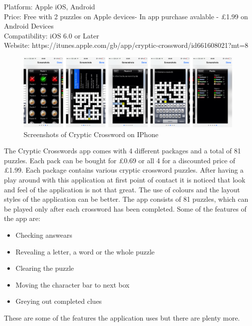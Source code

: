 Platform: Apple iOS, Android\\
Price: Free with 2 puzzles on Apple devices- In app purchase avalable - \pounds1.99 on Android Devices\\
Compatibility: iOS 6.0 or Later\\
Website: https://itunes.apple.com/gb/app/cryptic-crossword/id661608021?mt=8


\begin{figure}[!ht]
    \includegraphics[width=\linewidth]{research/mobile_platforms/cc.png}
    \caption{Screenshots of Cryptic Crossword on IPhone}
\end{figure}

The Cryptic Crosswords app comes with 4 different packages and a total of 81 puzzles. Each pack can be bought for \pounds0.69 or all 4 for a discounted price of \pounds1.99. Each package contains various cryptic crossword puzzles. After having a play around with this application at first point of contact it is noticed that look and feel of the application is not that great. The use of colours and the layout styles of the application can be better. The app consists of 81 puzzles, which can be played only after each crossword has been completed. Some of the features of the app are:

\begin{itemize}
    \item Checking answears
    \item Revealing a letter, a word or the whole puzzle
    \item Clearing the puzzle
    \item Moving the character bar to next box
    \item Greying out completed clues
\end{itemize}

These are some of the features the application uses but there are plenty more. 

